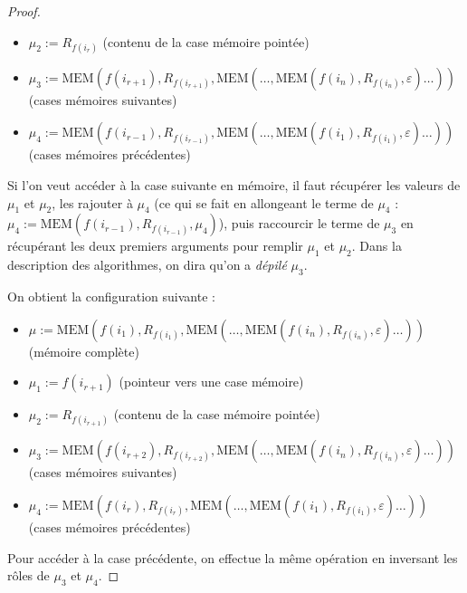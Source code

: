 \documentclass{report}
\begin{document}
\begin{proof}
\begin{itemize}
						\item 	
								$\mu_2 := R_{f(i_r)}$ (contenu de la case mémoire pointée)
								
						\item 	
								$\mu_3 := \text{MEM}(f(i_{r+1}), R_{f(i_{r+1})}, \text{MEM}( \dots, \text{MEM}(f(i_n), R_{f(i_n)}, \varepsilon) \dots ) )$ (cases mémoires suivantes)
								
						\item 	
								$\mu_4 := \text{MEM}(f(i_{r-1}), R_{f(i_{r-1})}, \text{MEM}( \dots, \text{MEM}(f(i_1), R_{f(i_1)}, \varepsilon) \dots ) )$ (cases mémoires précédentes)
					\end{itemize}
					
					Si l'on veut accéder à la case suivante en mémoire, il faut récupérer les valeurs de $\mu_1$ et $\mu_2$, les rajouter à $\mu_4$ (ce qui se fait en allongeant le terme de $\mu_4$ : $\mu_4 := \text{MEM}(f(i_{r-1}), R_{f(i_{r-1})}, \mu_4)$), puis raccourcir le terme de $\mu_3$ en récupérant les deux premiers arguments pour remplir $\mu_1$ et $\mu_2$. Dans la description des algorithmes, on dira qu'on a \emph{dépilé} $\mu_3$. 
					
					On obtient la configuration suivante : 
					
					
					\begin{itemize}
						\item 	
								$\mu := \text{MEM}(f(i_1), R_{f(i_1)}, \text{MEM}( \dots, \text{MEM}(f(i_n), R_{f(i_n)}, \varepsilon) \dots ) )$ (mémoire complète)
						
						\item 	
								$\mu_1 := f(i_{r+1})$ (pointeur vers une case mémoire)
						
						\item 	
								$\mu_2 := R_{f(i_{r+1})}$ (contenu de la case mémoire pointée)
						
						\item 	
								$\mu_3 := \text{MEM}(f(i_{r+2}), R_{f(i_{r+2})}, \text{MEM}( \dots, \text{MEM}(f(i_n), R_{f(i_n)}, \varepsilon) \dots ) )$ (cases mémoires suivantes)
						
						\item 	
								$\mu_4 := \text{MEM}(f(i_{r}), R_{f(i_{r})}, \text{MEM}( \dots, \text{MEM}(f(i_1), R_{f(i_1)}, \varepsilon) \dots ) )$ (cases mémoires précédentes)
					\end{itemize}					
					
					
					Pour accéder à la case précédente, on effectue la même opération en inversant les rôles de $\mu_3$ et $\mu_4$.
					

\end{proof}
\end{document}
